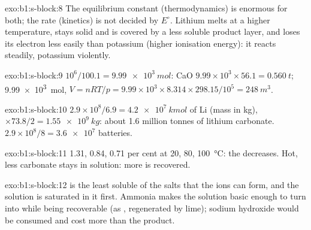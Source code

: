 \begin{solution}{exo:b1:s-block:8}
The equilibrium constant (thermodynamics) is enormous for both; the rate
(kinetics) is not decided by $E^\circ$. Lithium melts at a higher
temperature, stays solid and is covered by a less soluble product layer,
and loses its electron less easily than potassium (higher ionisation
energy): it reacts steadily, potassium violently.
\end{solution}

\begin{solution}{exo:b1:s-block:9}
$10^6/100.1 = \qty{9.99e3}{mol}$: CaO $9.99 \times 10^3 \times 56.1 =
\qty{0.560}{t}$;  \qty{9.99e3}{mol}, $V = nRT/p = 9.99 \times 10^3
\times 8.314 \times 298.15/10^5 = \qty{248}{m^3}$.
\end{solution}

\begin{solution}{exo:b1:s-block:10}
$2.9 \times 10^8/6.9 = \qty{4.2e7}{kmol}$ of Li (mass in kg), $\times 73.8/2 =
\qty{1.55e9}{kg}$: about 1.6 million tonnes of lithium carbonate.
$2.9 \times 10^8/8 = \num{3.6e7}$ batteries.
\end{solution}

\begin{solution}{exo:b1:s-block:11}
1.31, 0.84, 0.71 per cent at 20, 80, \qty{100}{\celsius}: the 
decreases. Hot, less carbonate stays in solution: more is recovered.
\end{solution}

\begin{solution}{exo:b1:s-block:12}
 is the least soluble of the salts that the ions can form, and
the solution is saturated in it first. Ammonia makes the solution basic
enough to turn  into  while being recoverable (as
, regenerated by lime); sodium hydroxide would be consumed and
cost more than the product.
\end{solution}

